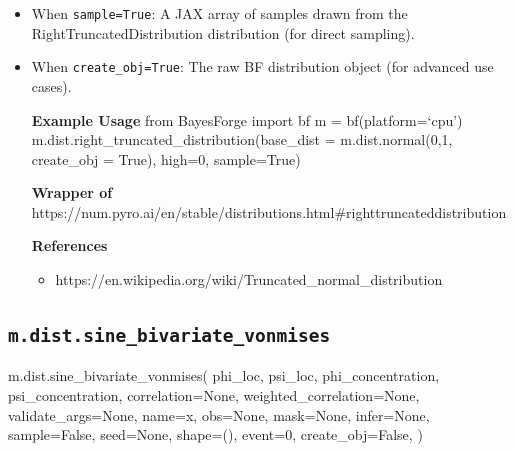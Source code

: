 \documentclass[
  letterpaper,
  DIV=11,
  numbers=noendperiod]{scrartcl}
\newenvironment{Shaded}{\begin{snugshade}}{\end{snugshade}}
\newcommand{\DecValTok}[1]{\textcolor[rgb]{0.68,0.00,0.00}{#1}}
\newcommand{\NormalTok}[1]{\textcolor[rgb]{0.00,0.23,0.31}{#1}}
\newcommand{\OperatorTok}[1]{\textcolor[rgb]{0.37,0.37,0.37}{#1}}
\newcommand{\StringTok}[1]{\textcolor[rgb]{0.13,0.47,0.30}{#1}}
\newcommand{\VariableTok}[1]{\textcolor[rgb]{0.07,0.07,0.07}{#1}}
\providecommand{\tightlist}{%
  \setlength{\itemsep}{0pt}\setlength{\parskip}{0pt}}\usepackage{longtable,booktabs,array}
\begin{document}
\begin{itemize}
\item
  When \texttt{sample=True}: A JAX array of samples drawn from the
  RightTruncatedDistribution distribution (for direct sampling).
\item
  When \texttt{create\_obj=True}: The raw BF distribution object (for
  advanced use cases).

  \textbf{Example Usage} from BayesForge import bf m =
  bf(platform=`cpu') m.dist.right\_truncated\_distribution(base\_dist =
  m.dist.normal(0,1, create\_obj = True), high=0, sample=True)

  \textbf{Wrapper of}
  https://num.pyro.ai/en/stable/distributions.html\#righttruncateddistribution

  \textbf{References}

  \begin{itemize}
  \tightlist
  \item
    https://en.wikipedia.org/wiki/Truncated\_normal\_distribution
  \end{itemize}
\end{itemize}

\subsection{\texorpdfstring{\texttt{m.dist.sine\_bivariate\_vonmises}}{m.dist.sine\_bivariate\_vonmises}}\label{sine_bivariate_vonmises}

\begin{Shaded}
\begin{Highlighting}[]
\NormalTok{m.dist.sine\_bivariate\_vonmises(}
\NormalTok{    phi\_loc,}
\NormalTok{    psi\_loc,}
\NormalTok{    phi\_concentration,}
\NormalTok{    psi\_concentration,}
\NormalTok{    correlation}\OperatorTok{=}\VariableTok{None}\NormalTok{,}
\NormalTok{    weighted\_correlation}\OperatorTok{=}\VariableTok{None}\NormalTok{,}
\NormalTok{    validate\_args}\OperatorTok{=}\VariableTok{None}\NormalTok{,}
\NormalTok{    name}\OperatorTok{=}\StringTok{\textquotesingle{}x\textquotesingle{}}\NormalTok{,}
\NormalTok{    obs}\OperatorTok{=}\VariableTok{None}\NormalTok{,}
\NormalTok{    mask}\OperatorTok{=}\VariableTok{None}\NormalTok{,}
\NormalTok{    infer}\OperatorTok{=}\VariableTok{None}\NormalTok{,}
\NormalTok{    sample}\OperatorTok{=}\VariableTok{False}\NormalTok{,}
\NormalTok{    seed}\OperatorTok{=}\VariableTok{None}\NormalTok{,}
\NormalTok{    shape}\OperatorTok{=}\NormalTok{(),}
\NormalTok{    event}\OperatorTok{=}\DecValTok{0}\NormalTok{,}
\NormalTok{    create\_obj}\OperatorTok{=}\VariableTok{False}\NormalTok{,}
\NormalTok{)}
\end{Highlighting}
\end{Shaded}
\end{document}
